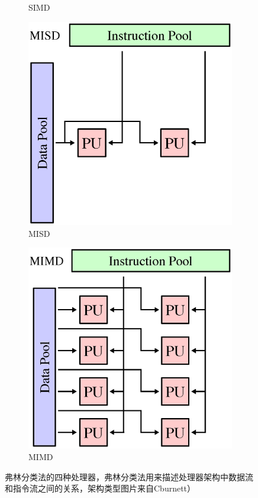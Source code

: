 \begin{figure}
\begin{fullwidth}
\begin{subfigure}[b]{0.245\thewidth}
		\caption{SIMD}
	\end{subfigure}
	\begin{subfigure}[b]{0.245\thewidth}
		\includegraphics[width=1.\textwidth]{figures/rp/MISD}
		\caption{MISD}
	\end{subfigure}
	\begin{subfigure}[b]{0.245\thewidth}
		\includegraphics[width=1.\textwidth]{figures/rp/MIMD}
		\caption{MIMD}
	\end{subfigure}
\caption{弗林分类法的四种处理器，弗林分类法用来描述处理器架构中数据流和指令流之间的关系，架构类型图片来自Cburnett）}
\label{f:rp-flynn}
\end{fullwidth}
\end{figure}

